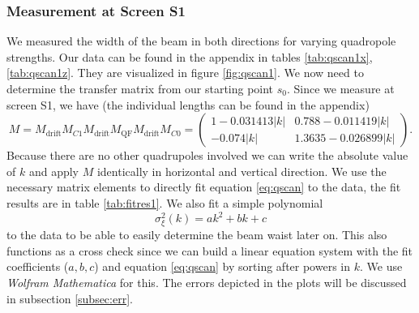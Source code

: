 \documentclass[11pt,a4paper,notitlepage]{scrartcl}
\begin{document}
\subsubsection{Measurement at Screen S1}
We measured the width of the beam in both directions for varying quadropole strengths. Our data can be found in the appendix in tables \ref{tab:qscan1x},\ref{tab:qscan1z}. They are visualized in figure \ref{fig:qscan1}. We now need to determine the transfer matrix from our starting point $s_0$. Since we measure at screen S1, we have (the individual lengths can be found in the appendix) $$M=M_\text{drift}M_{C1}M_\text{drift}M_\text{QF}M_{\text{drift}}M_{C0}=\begin{pmatrix}
	1-0.031413|k| &0.788-0.011419|k|\\
	-0.074|k| &1.3635-0.026899|k|
\end{pmatrix}.$$
Because there are no other quadrupoles involved we can write the absolute value of $k$ and apply $M$ identically in horizontal and vertical direction.
We use the necessary matrix elements to directly fit equation \eqref{eq:qscan} to the data, the fit results are in table \ref{tab:fitres1}. We also fit a simple polynomial $$\sigma_\xi^2(k)=ak^2+bk+c$$ to the data to be able to easily determine the beam waist later on. This also functions as a cross check since we can build a linear equation system with the fit coefficients ($a,b,c$) and equation \eqref{eq:qscan} by sorting after powers in $k$. We use \emph{Wolfram Mathematica} for this. The errors depicted in the plots will be discussed in subsection \ref{subsec:err}. 
\end{document}
